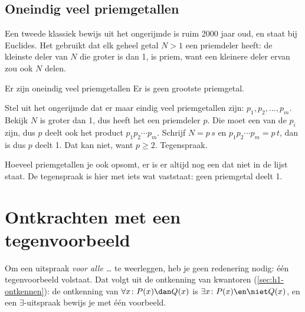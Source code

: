 \begin{oefeningen}
\end{oefeningen}

\subsection{Oneindig veel priemgetallen}

Een tweede klassiek bewijs uit het ongerijmde is ruim 2000 jaar oud, en staat bij Euclides. Het gebruikt dat elk geheel getal $N > 1$ een priemdeler heeft: de kleinste deler van $N$ die groter is dan 1, is priem, want een kleinere deler ervan zou ook $N$ delen.

\begin{theorie}
\begin{stelling}{Er zijn oneindig veel priemgetallen}
Er is geen grootste priemgetal.
\end{stelling}

\begin{bewijs}
Stel uit het ongerijmde dat er maar eindig veel priemgetallen zijn: $p_1, p_2, \ldots, p_m$. Bekijk
$N$ is groter dan 1, dus heeft het een priemdeler $p$. Die moet een van de $p_i$ zijn, dus $p$ deelt ook het product $p_1 p_2 \cdots p_m$. Schrijf $N = p\,s$ en $p_1 p_2 \cdots p_m = p\,t$, dan is
dus $p$ deelt 1. Dat kan niet, want $p \geqslant 2$. Tegenspraak.
\end{bewijs}
\end{theorie}

Hoeveel priemgetallen je ook opsomt, er is er altijd nog een dat niet in de lijst staat. De tegenspraak is hier met iets wat vaststaat: geen priemgetal deelt 1.

\begin{oefeningen}
\end{oefeningen}

\section{Ontkrachten met een tegenvoorbeeld}\label{sec:h2-tegenvoorbeeld}

Om een uitspraak \textit{voor alle \ldots} te weerleggen, heb je geen redenering nodig: één tegenvoorbeeld volstaat. Dat volgt uit de ontkenning van kwantoren (\ref{sec:h1-ontkennen}): de ontkenning van $\forall x\colon P(x) \dan Q(x)$ is $\exists x\colon P(x) \en \niet Q(x)$, en een $\exists$-uitspraak bewijs je met één voorbeeld.

